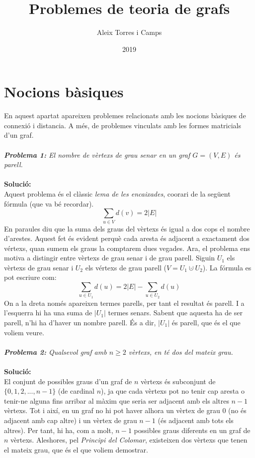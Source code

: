 \documentclass[10pt]{article}
\title{Problemes de teoria de grafs}
\author{Aleix Torres i Camps}
\date{2019}
\begin{document}
\maketitle

\maketitle
\section{Nocions bàsiques}
En aquest apartat apareixen problemes relacionats amb les nocions bàsiques de connexió i distancia. A més, de problemes vinculats amb les formes matricials d'un graf. \\ \\

\large
\textsl{\textbf{Problema 1:} El nombre de vèrtexs de grau senar en un graf $G = (V, E)$ és parell.} \\ \\
\textbf{Solució:} \\
\normalsize
Aquest problema és el clàssic \textit{lema de les encaixades}, co\lgem orari de la següent fórmula (que va bé recordar).
$$
\sum_{u\in V} d(v) = 2 |E|
$$
En paraules diu que la suma dels graus del vèrtexs és igual a dos cops el nombre d'arestes. Aquest fet és evident perquè cada aresta és adjacent a exactament dos vértexs, quan sumem els graus la comptarem dues vegades. Ara, el problema ens motiva a distingir entre vèrtexs de grau senar i de grau parell. Siguin $U_1$ els vèrtexs de grau senar i $U_2$ els vértexs de grau parell ($V = U_1 \cupdot U_2$). La fórmula es pot escriure com:
$$
\sum_{u\in U_1} d(u) = 2 |E| - \sum_{u\in U_2} d(u)
$$
On a la dreta només apareixen termes parells, per tant el resultat és parell. I a l'esquerra hi ha una suma de $|U_1|$ termes senars. Sabent que aquesta ha de ser parell, n'hi ha d'haver un nombre parell. És a dir, $|U_1|$ és parell, que és el que voliem veure. \\ \\

\large
\textsl{\textbf{Problema 2:} Qualsevol graf amb $n\geq2$ vèrtexs, en té dos del mateix grau.} \\ \\
\textbf{Solució:} \\
\normalsize
El conjunt de possibles graus d'un graf de $n$ vèrtexs és subconjunt de $\{0,1,2,...,n-1\}$ (de cardinal $n$), ja que cada vèrtexs pot no tenir cap aresta o tenir-ne alguna fins arribar al màxim que seria ser adjacent amb els altres $n-1$ vèrtexs. Tot i així, en un graf no hi pot haver alhora un vèrtex de grau 0 (no és adjacent amb cap altre) i un vèrtex de grau $n-1$ (és adjacent amb tots els altres). Per tant, hi ha, com a molt, $n-1$ possibles graus diferents en un graf de $n$ vèrtexs. Aleshores, pel \textsl{Principi del Colomar}, existeixen dos vèrtexs que tenen el mateix grau, que és el que voliem demostrar. \\ \\
\end{document}
